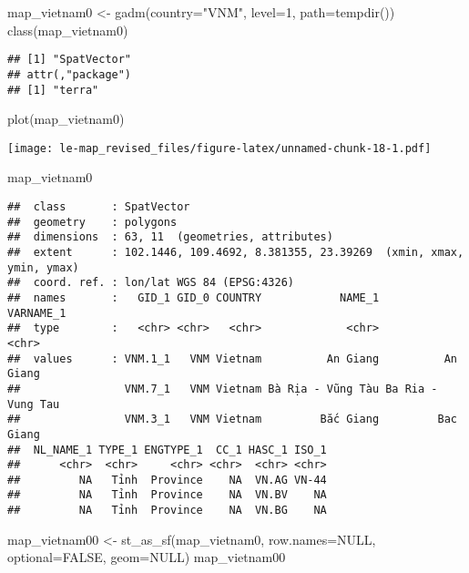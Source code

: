 \documentclass[
]{article}
\newenvironment{Shaded}{\begin{snugshade}}{\end{snugshade}}
\newcommand{\AttributeTok}[1]{\textcolor[rgb]{0.77,0.63,0.00}{#1}}
\newcommand{\ConstantTok}[1]{\textcolor[rgb]{0.00,0.00,0.00}{#1}}
\newcommand{\DecValTok}[1]{\textcolor[rgb]{0.00,0.00,0.81}{#1}}
\newcommand{\FunctionTok}[1]{\textcolor[rgb]{0.00,0.00,0.00}{#1}}
\newcommand{\NormalTok}[1]{#1}
\newcommand{\OtherTok}[1]{\textcolor[rgb]{0.56,0.35,0.01}{#1}}
\newcommand{\StringTok}[1]{\textcolor[rgb]{0.31,0.60,0.02}{#1}}
\begin{document}
\begin{Shaded}
\begin{Highlighting}[]
\NormalTok{map\_vietnam0 }\OtherTok{\textless{}{-}} \FunctionTok{gadm}\NormalTok{(}\AttributeTok{country=}\StringTok{"VNM"}\NormalTok{, }\AttributeTok{level=}\DecValTok{1}\NormalTok{, }\AttributeTok{path=}\FunctionTok{tempdir}\NormalTok{())}
\FunctionTok{class}\NormalTok{(map\_vietnam0)}
\end{Highlighting}
\end{Shaded}

\begin{verbatim}
## [1] "SpatVector"
## attr(,"package")
## [1] "terra"
\end{verbatim}

\begin{Shaded}
\begin{Highlighting}[]
\FunctionTok{plot}\NormalTok{(map\_vietnam0)}
\end{Highlighting}
\end{Shaded}

\texttt{[image: le-map\_revised\_files/figure-latex/unnamed-chunk-18-1.pdf]}

\begin{Shaded}
\begin{Highlighting}[]
\NormalTok{map\_vietnam0}
\end{Highlighting}
\end{Shaded}

\begin{verbatim}
##  class       : SpatVector 
##  geometry    : polygons 
##  dimensions  : 63, 11  (geometries, attributes)
##  extent      : 102.1446, 109.4692, 8.381355, 23.39269  (xmin, xmax, ymin, ymax)
##  coord. ref. : lon/lat WGS 84 (EPSG:4326) 
##  names       :   GID_1 GID_0 COUNTRY            NAME_1         VARNAME_1
##  type        :   <chr> <chr>   <chr>             <chr>             <chr>
##  values      : VNM.1_1   VNM Vietnam          An Giang          An Giang
##                VNM.7_1   VNM Vietnam Bà Rịa - Vũng Tàu Ba Ria - Vung Tau
##                VNM.3_1   VNM Vietnam         Bắc Giang         Bac Giang
##  NL_NAME_1 TYPE_1 ENGTYPE_1  CC_1 HASC_1 ISO_1
##      <chr>  <chr>     <chr> <chr>  <chr> <chr>
##         NA   Tỉnh  Province    NA  VN.AG VN-44
##         NA   Tỉnh  Province    NA  VN.BV    NA
##         NA   Tỉnh  Province    NA  VN.BG    NA
\end{verbatim}

\begin{Shaded}
\begin{Highlighting}[]
\NormalTok{map\_vietnam00 }\OtherTok{\textless{}{-}} \FunctionTok{st\_as\_sf}\NormalTok{(map\_vietnam0, }\AttributeTok{row.names=}\ConstantTok{NULL}\NormalTok{, }\AttributeTok{optional=}\ConstantTok{FALSE}\NormalTok{, }\AttributeTok{geom=}\ConstantTok{NULL}\NormalTok{)}
\NormalTok{map\_vietnam00}
\end{Highlighting}
\end{Shaded}
\end{document}
